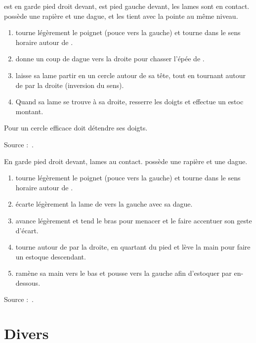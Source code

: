 \begin{technique}

\A est en garde pied droit devant, \D est pied gauche devant, les lames sont en contact.
\D possède une rapière et une dague, et les tient avec la pointe au même niveau.

\begin{enumerate}
	\item \A tourne légèrement le poignet (pouce vers la gauche) et tourne dans le sens horaire autour de \D.
	\item \D donne un coup de dague vers la droite pour chasser l'épée de \A.
	\item \A laisse sa lame partir en un cercle autour de sa tête, tout en tournant autour de \D par la droite (inversion du sens).
	\item Quand sa lame se trouve à sa droite, \A resserre les doigts et effectue un estoc montant.
\end{enumerate}

Pour un cercle efficace \A doit détendre ses doigts.

Source :~\cite{guidoux:dijon:thibault:2015}.

\end{technique}


\begin{technique}

En garde pied droit devant, lames au contact.
\D possède une rapière et une dague.

\begin{enumerate}
	\item \A tourne légèrement le poignet (pouce vers la gauche) et tourne dans le sens horaire autour de \D.
	\item \D écarte légèrement la lame de \A vers la gauche avec sa dague.
	\item \A avance légèrement et tend le bras pour menacer \D et le faire accentuer son geste d'écart.
	\item \A tourne autour de \D par la droite, en quartant du pied et lève la main pour faire un estoque descendant.
	\item \A ramène sa main vers le bas et pousse vers la gauche afin d'estoquer \D par en-dessous.
\end{enumerate}

Source :~\cite{guidoux:dijon:thibault:2015}.

\end{technique}


\section{Divers}


